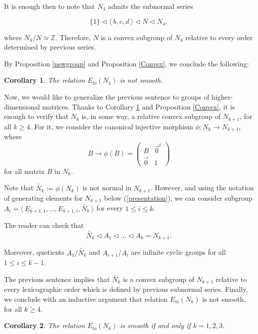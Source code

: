 \documentclass[12pt]{article}
\newtheorem{coro}{Corollary}
\theoremstyle{definition}
\begin{document}
It is enough then to note that $N_4$ admits the subnormal series

$$\{1\}\vartriangleleft \langle\ b,c,d\ \rangle \vartriangleleft N\vartriangleleft N_4,$$

where $N_4/N \simeq \mathbb{Z}$. Therefore, $N$ is a convex subgroup of $N_4$ relative to every order determined by previous series.

By Proposition \ref{newgroup} and Proposition \ref{Convex}, we conclude the following:

\begin{coro}
\label{groupN4}
    The relation $E_{lo}(N_4)$ is not smooth.
\end{coro}   

Now, we would like to generalize the previous sentence to groups of higher-dimensional matrices.
Thanks to Corollary \ref{groupN4} and Proposition \ref{Convex}, it is enough to verify that $N_k$ is, in some way, a relative convex subgroup of $N_{k+1}$, for all $k\geq 4$. For it, we consider the canonical injective morphism $\phi:N_k\rightarrow N_{k+1}$, where 
$$B\longrightarrow \phi(B)=\left (
\begin{array}{cc}
    B & \vec{0}^t \\
    \vec{0} & 1
\end{array}
\right )$$
for all matrix $B$ in $N_k$.

Note that $\tilde{N_k}:=\phi(N_k)$ is not normal in $N_{k+1}$. However, and using the notation of generating elements for $N_{k+1}$ below (\ref{presentation}),  we can consider subgroup $A_{i}=\langle\ E_{k+1,1},\dots, E_{k+1,i}, \tilde{N_k}\ \rangle$ for every $1\leq i\leq k$.

The reader can check that 
$$\tilde{N_{k}}\vartriangleleft A_1\vartriangleleft \dots\vartriangleleft A_k=N_{k+1}.$$

Moreover, quotients $A_1/\tilde{N_k}$ and $A_{i+1}/A_i$ are infinite cyclic groups for all $1\leq i\leq k-1$. 

The previous sentence implies that $\tilde{N_k}$ is a convex subgroup of $N_{k+1}$ relative to every lexicographic order which is defined by previous subnormal series. 
Finally, we conclude with an inductive argument that relation $E_{lo}(N_k)$ is not smooth, for all $k\geq 4$.

\begin{coro}
    The relation $E_{lo}(N_k)$ is smooth if and only if $k=1,2,3$.
\end{coro}
\end{document}
